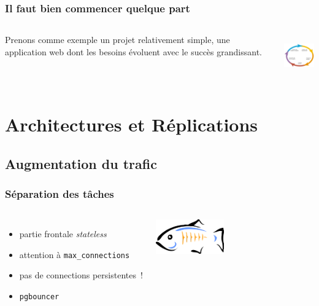 \documentclass[english]{beamer}
\begin{document}
\begin{frame}[fragile]
  \frametitle{Il faut bien commencer quelque part}

  \linebreak

\begin{columns}[c]

  Prenons comme exemple un projet relativement simple, une application web
  dont les besoins évoluent avec le succès grandissant.


\includegraphics[height=5em]{development_life_cycle.png}
\end{columns}
\end{frame}

\section{Architectures et Réplications}
\subsection{Augmentation du trafic}
\frame{\tableofcontents[currentsubsection]}

\begin{frame}[fragile]
  \frametitle{Séparation des tâches}

  \linebreak
  \linebreak

\begin{columns}[c]

  \begin{itemize}
   \item<1-> partie frontale \textit{stateless}
   \item<2-> attention à \texttt{max\_connections}
   \item<2-> pas de connections persistentes !
   \item<3-> \texttt{pgbouncer}
  \end{itemize}  

\includegraphics[height=4em]{bouncer.png}
\end{columns}
\end{frame}
\end{document}
